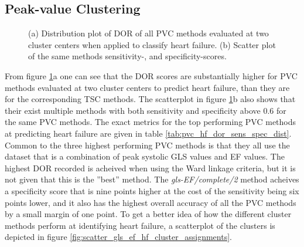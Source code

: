 \subsection{Peak-value Clustering}

\begin{figure}[htb]
    \centering
    
    \caption{(a) Distribution plot of DOR of all PVC methods evaluated at two cluster centers when applied to classify heart failure.
             (b) Scatter plot of the same methods sensitivity-, and specificity-scores.}
    \label{fig:pvc_hf_dor_sens_spec_dist}
\end{figure}

From figure \ref{fig:pvc_hf_dor_sens_spec_dist}a one can see that the DOR scores are substantially higher for PVC methods evaluated at two cluster centers to predict heart failure, 
than they are for the corresponding TSC methods. 
The scatterplot in figure \ref{fig:pvc_hf_dor_sens_spec_dist}b also shows that their exist multiple methods with both sensitivity and specificity above $0.6$ for the same PVC methods.
The exact metrics for the top performing PVC methods at predicting heart failure are given in table \ref{tab:pvc_hf_dor_sens_spec_dist}.
Common to the three highest performing PVC methods is that they all use the dataset that is a combination of peak systolic GLS values and EF values.
The highest DOR recorded is acheived when using the Ward linkage criteria, but it is not given that this is the ''best'' method.
The \textit{gls-EF/complete/2} method acheives a specificity score that is nine points higher at the cost of the sensitivity being six points lower, 
and it also has the highest overall accuracy of all the PVC methods by a small margin of one point. 
To get a better idea of how the different cluster methods perform at identifying heart failure, a scatterplot of the clusters is depicted in figure 
\ref{fig:scatter_gls_ef_hf_cluster_assignments}. \bigskip

